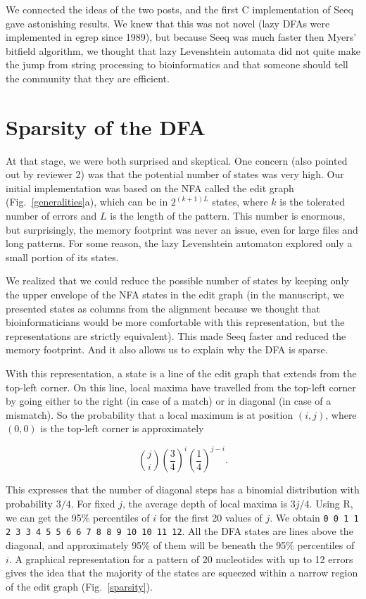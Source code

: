 \documentclass[12pt]{article}
\begin{document}
We connected the ideas of the two posts, and the first C
implementation of Seeq gave astonishing results. We knew that this
was not novel (lazy DFAs were implemented in egrep since 1989), but
because Seeq was much faster then Myers' bitfield algorithm,
we thought that lazy Levenshtein automata did not quite
make the jump from string processing to bioinformatics and that
someone should tell the community that they are efficient.

\section{Sparsity of the DFA}
\label{sketch}

At that stage, we were both surprised and skeptical. One concern (also
pointed out by reviewer 2) was that the potential number of states
was very high. Our initial implementation was based on the NFA
called the edit graph (Fig.~\ref{generalities}a),
which can be in $2^{(k+1)L}$ states, where $k$
is the tolerated number of errors and $L$ is the length of the
pattern. This number is enormous, but surprisingly, the memory
footprint was never an issue,
even for large files and long patterns. For some reason,
the lazy Levenshtein automaton explored only a small portion of its
states.

We realized that we could reduce the possible number of states by
keeping only the upper envelope of the NFA states in the edit graph
(in the manuscript, we presented states as columns from the alignment
because we thought that bioinformaticians would be more comfortable
with this representation, but the representations are strictly
equivalent). This made Seeq faster and reduced the memory footprint.
And it also allows us to explain why the DFA is sparse.

With this representation, a state is a line of the edit graph that
extends from the top-left
corner. On this line, local maxima have travelled from the top-left
corner by going either to the right (in case of a match) or in
diagonal (in case of a mismatch). So the probability that a local
maximum is at position $(i,j)$, where $(0,0)$ is
the top-left corner is approximately

\begin{equation}
{j \choose i} \left(\frac{3}{4}\right)^i
  \left(\frac{1}{4}\right)^{j-i}.
\end{equation}

This expresses that the number of diagonal steps has a binomial
distribution with probability $3/4$. For fixed $j$, the average
depth of local maxima is $3j/4$. Using R, we can get the 95\%
percentiles of $i$ for the first 20 values of $j$. We obtain
\texttt{0  0  1  1  2  3  3  4  5  5  6  6  7  8  8  9 10 10 11 12}.
All the DFA states are lines above the diagonal, and approximately
95\% of them will be beneath the 95\% percentiles of $i$. A graphical
representation for a pattern of 20 nucleotides with up to 12 errors
gives the idea that the majority of the states are squeezed within
a narrow region of the edit graph (Fig.~\ref{sparsity}).
\end{document}
